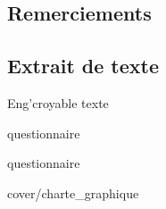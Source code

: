 \documentclass[a4paper,11pt,twoside]{article}
\date{\today}
\begin{document}
\dosecttoc{} %


\thispagestyle{empty} %
\subsection*{Remerciements}

\clearpage


\thispagestyle{empty} %
\setcounter{secnumdepth}{3}
\tableofcontents
\clearpage


\setcounter{page}{1}





\clearpage
\appendix
\renewcommand{\stctitle}{}                          %
\renewcommand\thesubsection{A\arabic{subsection}}   %
\renewcommand{\stcSSfont}{}                         %
\secttoc


\clearpage
{}

\subsection{Extrait de texte}

Eng'croyable texte

\clearpage



{questionnaire}
\clearpage



{questionnaire}
\clearpage


{cover/charte_graphique}

\end{document}
